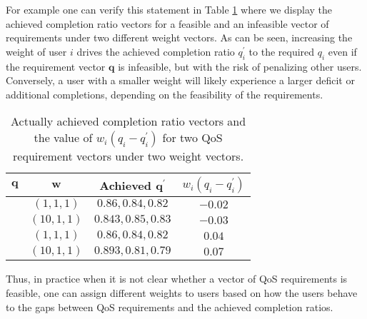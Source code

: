 \documentclass[prodmode,acmtompecs]{acmsmall}
\begin{document}
For example one can verify this statement in Table \ref{tab_q_and_q_prime} where we display the achieved completion ratio vectors for a feasible and an infeasible vector of requirements under two different weight vectors. As can be seen, increasing the weight of user $i$ drives the achieved completion ratio $q^\prime_i$ to the 
required $q_i$ even if the requirement vector $\mathbf{q}$ is infeasible, but with the risk of penalizing other users. Conversely, a user with a smaller weight will likely experience a larger deficit or additional completions, depending on the feasibility of the requirements. 





\begin{table}[h]
\normalsize
    \centering
	\begin{tabular}{|c|c|c|c|}
	 \hline
	 $\mathbf{q}$ & $\mathbf{w}$ & Achieved $\mathbf{q}^\prime$ & $w_i(q_i - q^\prime_i)$	\\
	 \hline
	 \multirow{4}{*}{} &
	 \multirow{2}{*}{$(1,1,1)$} & \multirow{2}{*}{$0.86, 0.84, 0.82$} & \multirow{2}{*}{$-0.02$}	\\
	 Feasible: &  &  &	\\
	 \cline{2-4}
	 $0.84, 0.82, 0.80$ & \multirow{2}{*}{$(10,1,1)$} & \multirow{2}{*}{$0.843, 0.85, 0.83$} & \multirow{2}{*}{$-0.03$}	\\
	  &  &  &	\\
	 \hline
	 \multirow{4}{*}{} &
	 \multirow{2}{*}{$(1,1,1)$} & \multirow{2}{*}{$0.86, 0.84, 0.82$} & \multirow{2}{*}{$0.04$}	\\
	 Infeasible: &  &  &	\\
	 \cline{2-4}
	 $0.90, 0.88, 0.86$ & \multirow{2}{*}{$(10,1,1)$} & \multirow{2}{*}{$0.893, 0.81, 0.79$} & \multirow{2}{*}{$0.07$}	\\
	  &  &  &	\\
	 \hline
	\end{tabular}
    \caption{Actually achieved completion ratio vectors and the value of $w_i(q_i - q^\prime_i)$ for two QoS requirement vectors under two weight vectors. }
    \label{tab_q_and_q_prime}
\end{table}



Thus, in practice when it is not clear whether a vector of QoS requirements is feasible, one can assign different weights to users based on how the users behave to the gaps between QoS requirements and the achieved completion ratios. 
\end{document}

